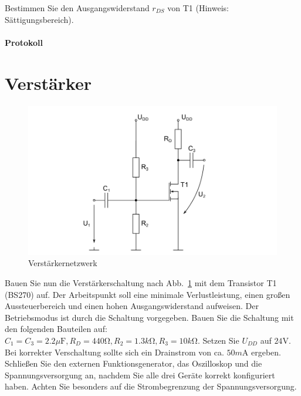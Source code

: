 \documentclass[10pt]{scrreprt}
\begin{document}
    Bestimmen Sie den Ausgangswiderstand $r_{DS}$ von T1 (Hinweis: Sättigungsbereich).

    \paragraph{Protokoll}

    \section{Verstärker} \label{sec:auf43}
    \begin{figure}[H]
        \includegraphics[width=\textwidth]{abb10.png}
        \caption{Verstärkernetzwerk}
        \label{fig:abb10}
    \end{figure}
    Bauen Sie nun die Verstärkerschaltung nach Abb.~\ref{fig:abb10} mit dem Transistor T1 (BS270) auf.
    Der Arbeitspunkt soll eine minimale Verlustleistung, einen großen Aussteuerbereich und
    einen hohen Ausgangswiderstand aufweisen. Der Betriebsmodus ist durch die Schaltung
    vorgegeben. Bauen Sie die Schaltung mit den folgenden Bauteilen auf: $C_1 = C_3 = 2.2\si{\mu \farad},
    R_D = 440\si{\ohm}, R_2 = 1.3\si{k\ohm}, R_3 = 10\si{k\ohm}$. Setzen Sie $U_{DD}$ auf $24\si{\volt}$. Bei korrekter
    Verschaltung sollte sich ein Drainstrom von ca. $50\si{m \ampere}$ ergeben. Schließen Sie den externen
    Funktionsgenerator, das Oszilloskop und die Spannungsversorgung an, nachdem Sie alle
    drei Geräte korrekt konfiguriert haben. Achten Sie besonders auf die Strombegrenzung
    der Spannungsversorgung.
\end{document}
